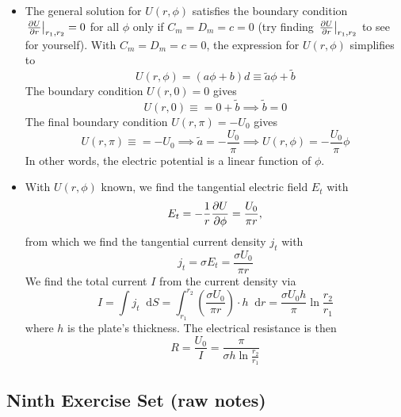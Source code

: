 \documentclass[11pt, a4paper]{article}
\newcommand{\diff}{\mathop{}\!\mathrm{d}} %
\renewcommand{\t}[1]{\tilde{#1}} %
\begin{document}
\begin{itemize}
	\item The general solution for $ U(r, \phi) $ satisfies the boundary condition $ \eval{\pdv{U}{r}}_{r_{1}, r_{2}} = 0 $ for all $ \phi $ only if $ C_{m} = D_{m} = c = 0 $ (try finding $ \eval{\pdv{U}{r}}_{r_{1}, r_{2}}  $ to see for yourself). With $  C_{m} = D_{m} = c = 0 $, the expression for $ U(r, \phi) $ simplifies to
	\begin{equation*}
		U(r, \phi) = (a \phi + b)d \equiv \t{a}\phi + \t{b}
	\end{equation*}
	The boundary condition $ U(r, 0) = 0 $ gives
	\begin{equation*}
		U(r, 0) \equiv = 0 + \t{b} \implies \t{b} = 0
	\end{equation*}
	The final boundary condition $ U(r, \pi) = -U_{0} $ gives
	\begin{equation*}
		U(r, \pi) \equiv = - U_{0} \implies \t{a} = -\frac{U_{0}}{\pi} \implies U(r, \phi) = - \frac{U_{0}}{\pi} \phi
	\end{equation*}
	In other words, the electric potential is a linear function of $ \phi $. 
	
	\item With $ U(r, \phi) $ known, we find the tangential electric field $ E_{t} $ with
	\begin{equation*}
		E_{t} = - \frac{1}{r}\pdv{U}{\phi} = \frac{U_{0}}{\pi r},
	\end{equation*}
	from which we find the tangential current density $ j_{t} $ with
	\begin{equation*}
		j_{t} = \sigma E_{t} = \frac{\sigma U_{0}}{\pi r}
	\end{equation*}
	We find the total current $ I $ from the current density via
	\begin{equation*}
		I = \int j_{t} \diff S = \int_{r_{1}}^{r_{2}} \left(\frac{\sigma U_{0}}{\pi r}\right) \cdot h \diff r = \frac{\sigma U_{0} h}{\pi} \ln \frac{r_{2}}{r_{1}}
	\end{equation*}
	where $ h $ is the plate's thickness. The electrical resistance is then
	\begin{equation*}
		R = \frac{U_{0}}{I} = \frac{\pi}{\sigma h \ln \frac{r_{2}}{r_{1}}}
	\end{equation*}
\end{itemize}

\subsection{Ninth Exercise Set (raw notes)}
\end{document}
